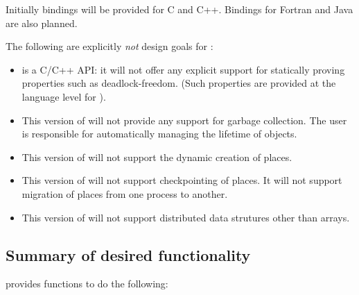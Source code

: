 Initially bindings will be provided for C and C++. Bindings for Fortran
and Java are also planned.

The following are explicitly {\em not} design goals for \Xtenlib:

\begin{itemize}
	\item \Xtenlib{} is a C/C++ API: it will not offer any explicit
		support for statically proving properties such as deadlock-freedom.
		(Such properties are provided at the language level for \Xten).

	\item This version of \Xtenlib{} will not provide any support for
		garbage collection. The user is responsible for automatically managing
		the lifetime of objects.

	\item This version of \Xtenlib{} will not support the dynamic creation of places.

	\item This version of \Xtenlib{} will not support checkpointing of
		places. It will not support migration of places from one process to
		another.

	\item This version of \Xtenlib{} will not support distributed
		data strutures other than arrays.
\end{itemize}

\subsection{Summary of desired functionality}

\Xtenlib{} provides functions to do the following:

